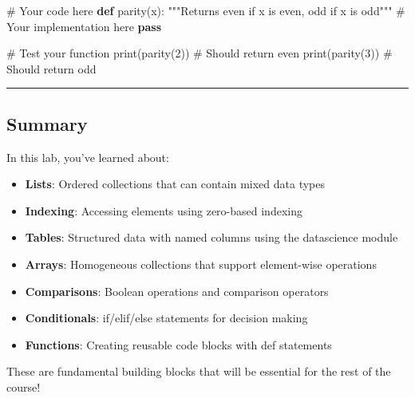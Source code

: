 \documentclass[
  11pt,
]{article}
\newenvironment{Shaded}{\begin{snugshade}}{\end{snugshade}}
\newcommand{\BuiltInTok}[1]{\textcolor[rgb]{0.00,0.23,0.31}{#1}}
\newcommand{\CommentTok}[1]{\textcolor[rgb]{0.37,0.37,0.37}{#1}}
\newcommand{\ControlFlowTok}[1]{\textcolor[rgb]{0.00,0.23,0.31}{\textbf{#1}}}
\newcommand{\DecValTok}[1]{\textcolor[rgb]{0.68,0.00,0.00}{#1}}
\newcommand{\KeywordTok}[1]{\textcolor[rgb]{0.00,0.23,0.31}{\textbf{#1}}}
\newcommand{\NormalTok}[1]{\textcolor[rgb]{0.00,0.23,0.31}{#1}}
\providecommand{\tightlist}{%
  \setlength{\itemsep}{0pt}\setlength{\parskip}{0pt}}\usepackage{longtable,booktabs,array}
\begin{document}
\begin{Shaded}
\begin{Highlighting}[]
\CommentTok{\# Your code here}
\KeywordTok{def}\NormalTok{ parity(x):}
    \CommentTok{"""Returns \textquotesingle{}even\textquotesingle{} if x is even, \textquotesingle{}odd\textquotesingle{} if x is odd"""}
    \CommentTok{\# Your implementation here}
    \ControlFlowTok{pass}

\CommentTok{\# Test your function}
\BuiltInTok{print}\NormalTok{(parity(}\DecValTok{2}\NormalTok{))  }\CommentTok{\# Should return \textquotesingle{}even\textquotesingle{}}
\BuiltInTok{print}\NormalTok{(parity(}\DecValTok{3}\NormalTok{))  }\CommentTok{\# Should return \textquotesingle{}odd\textquotesingle{}}
\end{Highlighting}
\end{Shaded}

\begin{center}\rule{0.5\linewidth}{0.5pt}\end{center}

\subsection{Summary}\label{summary}

In this lab, you've learned about:

\begin{itemize}
\tightlist
\item
  \textbf{Lists}: Ordered collections that can contain mixed data types
\item
  \textbf{Indexing}: Accessing elements using zero-based indexing
\item
  \textbf{Tables}: Structured data with named columns using the
  datascience module
\item
  \textbf{Arrays}: Homogeneous collections that support element-wise
  operations
\item
  \textbf{Comparisons}: Boolean operations and comparison operators
\item
  \textbf{Conditionals}: if/elif/else statements for decision making
\item
  \textbf{Functions}: Creating reusable code blocks with def statements
\end{itemize}

These are fundamental building blocks that will be essential for the
rest of the course!
\end{document}
